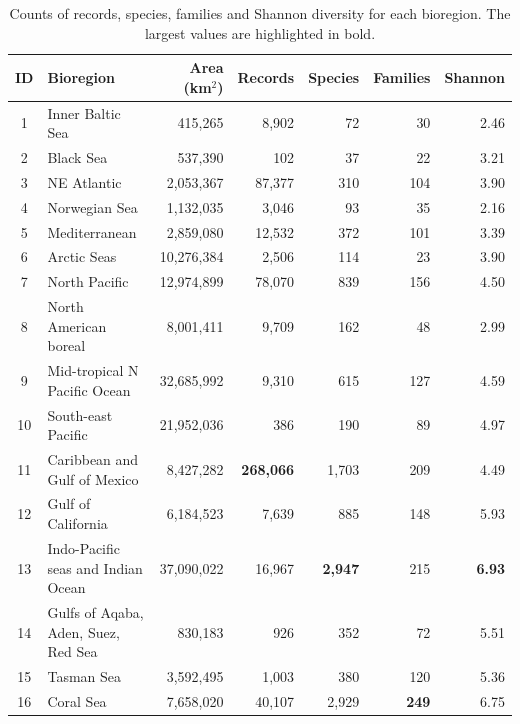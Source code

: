 \documentclass[12pt,authoryear]{elsarticle}
\begin{document}
\begin{table}[]
    \caption{Counts of records, species, families and Shannon diversity for each bioregion. The largest values are highlighted in bold.}
    \label{tab: recuento}
    \begin{tabular}{| c | l | r | r | r | r | r |}
\hline
  ID & Bioregion                        & Area (km$^2$) & Records   & Species & Families & Shannon \\  
\hline
  1  & Inner Baltic Sea                    &     415,265 &   8,902 &    72 &  30 & 2.46 \\ 
  2  & Black Sea                           &     537,390 &     102 &    37 &  22 & 3.21 \\ 
  3  & NE Atlantic                         &   2,053,367 &  87,377 &   310 & 104 & 3.90 \\ 
  4  & Norwegian Sea                       &   1,132,035 &   3,046 &    93 &  35 & 2.16 \\ 
  5  & Mediterranean                       &   2,859,080 &  12,532 &   372 & 101 & 3.39 \\ 
  6  & Arctic Seas                         &  10,276,384 &   2,506 &   114 &  23 & 3.90 \\ 
  7  & North Pacific                       &  12,974,899 &  78,070 &   839 & 156 & 4.50 \\ 
  8  & North American boreal               &   8,001,411 &   9,709 &   162 &  48 & 2.99 \\ 
  9  & Mid-tropical N Pacific Ocean        &  32,685,992 &   9,310 &   615 & 127 & 4.59 \\ 
  10 & South-east Pacific                  &  21,952,036 &     386 &   190 &  89 & 4.97 \\ 
  11 & Caribbean and Gulf of Mexico        &   8,427,282 & \textbf{268,066} & 1,703 & 209 & 4.49 \\ 
  12 & Gulf of California                  &   6,184,523 &   7,639 &   885 & 148 & 5.93 \\ 
  13 & Indo-Pacific seas and Indian Ocean  &  37,090,022 &  16,967 & \textbf{2,947} & 215 & \textbf{6.93} \\ 
  14 & Gulfs of Aqaba, Aden, Suez, Red Sea &     830,183 &     926 &   352 &  72 & 5.51 \\ 
  15 & Tasman Sea                          &   3,592,495 &   1,003 &   380 & 120 & 5.36 \\ 
  16 & Coral Sea                           &   7,658,020 &  40,107 & 2,929 & \textbf{249} & 6.75\\ 

\end{tabular}
\end{table}
\end{document}
